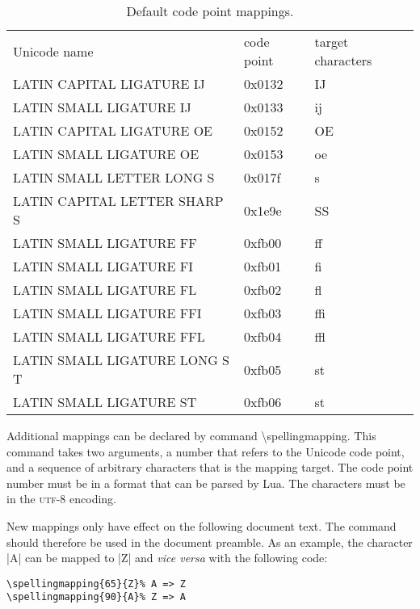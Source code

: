 \documentclass[11pt]{article}
\newcommand*{\acr}[1]{\mbox{\scshape#1}}
\newcommand*{\cmd}[1]{\mbox{\ttfamily\textbackslash#1}}
\newcommand*{\macro}[1]{\cmd{#1}\marginpar{\cmd{#1}}}
\newcommand*{\latinphrase}[1]{\foreignlanguage{latin}{\emph{#1}}}
\begin{document}
\begin{table}
  \centering

  \begin{tabular}{>{\ttfamily}l>{\ttfamily}l>{\ttfamily}l}
    \normalfont Unicode name & \normalfont code point & \normalfont target characters\\
    \addlinespace
    \toprule
    \addlinespace

    LATIN CAPITAL LIGATURE IJ & 0x0132 & IJ\\
    LATIN SMALL LIGATURE IJ & 0x0133 & ij\\
    LATIN CAPITAL LIGATURE OE & 0x0152 & OE\\
    LATIN SMALL LIGATURE OE & 0x0153 & oe\\
    LATIN SMALL LETTER LONG S & 0x017f & s\\
    LATIN CAPITAL LETTER SHARP S & 0x1e9e & SS\\
    LATIN SMALL LIGATURE FF & 0xfb00 & ff\\
    LATIN SMALL LIGATURE FI & 0xfb01 & fi\\
    LATIN SMALL LIGATURE FL & 0xfb02 & fl\\
    LATIN SMALL LIGATURE FFI & 0xfb03 & ffi\\
    LATIN SMALL LIGATURE FFL & 0xfb04 & ffl\\
    LATIN SMALL LIGATURE LONG S T & 0xfb05 & st\\
    LATIN SMALL LIGATURE ST & 0xfb06 & st\\
  \end{tabular}

  \caption{Default code point mappings.}
  \label{tab:cp-mapping}

\end{table}

Additional mappings can be declared by command \macro{spellingmapping}.
This command takes two arguments, a number that refers to the Unicode
code point, and a sequence of arbitrary characters that is the mapping
target.  The code point number must be in a format that can be parsed by
Lua.  The characters must be in the \acr{utf-8} encoding.

New mappings only have effect on the following document text.  The
command should therefore be used in the document preamble.  As an
example, the character |A| can be mapped to |Z| and \latinphrase{vice
  versa} with the following code:

\begin{lstlisting}[language={[LaTeX]TeX}]
\spellingmapping{65}{Z}% A => Z
\spellingmapping{90}{A}% Z => A
\end{lstlisting}
\end{document}
